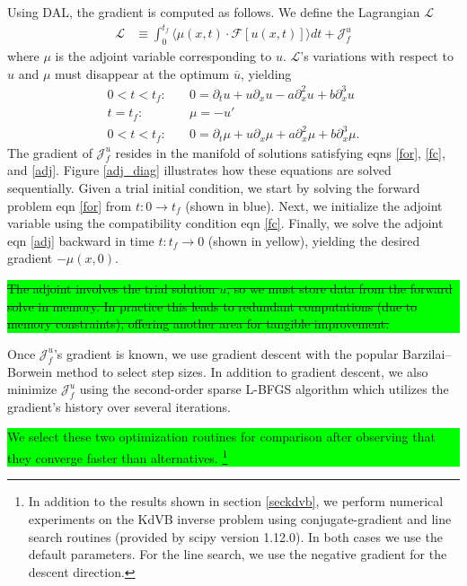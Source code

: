 \documentclass[%
 reprint,
 amsmath,amssymb,
 aps,
 pre,
]{revtex4-2}
\newcommand{\hly}[1]{\colorbox{lime}{\parbox{\columnwidth}{#1}}}
\renewcommand\L {\mathcal{L}}
\newcommand{\Juf}{\mathcal{J}^{u}_f}
\begin{document}
Using DAL, the gradient is computed as follows.
We define the Lagrangian $\L$
\begin{align}
  \L &\equiv \int_0^{t_f} \Big\langle \mu(x,t) \cdot \mathcal{F}[u(x,t)] \Big\rangle dt + \Juf
\end{align}
where $\mu$ is the adjoint variable corresponding to $u$.
$\L$'s variations with respect to $u$ and $\mu$ must disappear at the optimum $\overline{u}$, yielding
\begin{align}
  0<t<t_f: \quad  &0 =  \partial_t u + u\partial_x u - a\partial_x^2 u + b\partial_x^3 u \label{for}\\
  t=t_f:  \quad &\mu = -u' \label{fc}\\
  0<t<t_f: \quad &0 = \partial_t\mu + u\partial_x \mu + a\partial_x^2 \mu + b\partial_x^3 \mu \label{adj}.
\end{align}
The gradient of $\Juf$ resides in the manifold of solutions satisfying eqns \ref{for}, \ref{fc}, and \ref{adj}.
Figure \ref{adj_diag} illustrates how these equations are solved sequentially.
Given a trial initial condition, we start by solving the forward problem eqn \ref{for} from $t:0\to t_f$ (shown in blue). 
Next, we initialize the adjoint variable using the compatibility condition eqn \ref{fc}. 
Finally, we solve the adjoint eqn \ref{adj} backward in time $t:t_f\to 0$ (shown in yellow), yielding the desired gradient $-\mu(x,0)$. 
\hly{\st{The adjoint involves the trial solution $u$, so we must store data from the forward solve in memory. 
In practice this leads to redundant computations (due to memory constraints), offering another area for tangible improvement.}}

Once $\Juf$'s gradient is known, we use gradient descent with the popular Barzilai--Borwein method \cite{10.1093/imanum/8.1.141} to select step sizes. 
In addition to gradient descent, we also minimize $\Juf$ using the second-order sparse L-BFGS algorithm \cite{doi:10.1137/0916069} which utilizes the gradient's history over several iterations.
\hly{We select these two optimization routines for comparison after observing that they converge faster than alternatives. \footnote[2]{In addition to the results shown in section \ref{seckdvb}, we perform numerical experiments on the KdVB inverse problem using conjugate-gradient and line search routines (provided by scipy version 1.12.0).
In both cases we use the default parameters.
For the line search, we use the negative gradient for the descent direction.}}
\end{document}
